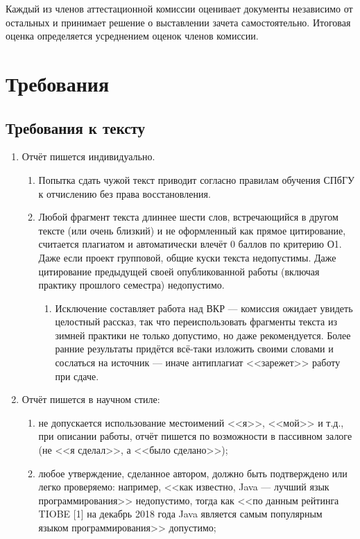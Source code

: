 \documentclass{article}
\begin{document}
Каждый из членов аттестационной комиссии оценивает документы независимо от остальных и принимает решение о выставлении зачета самостоятельно. Итоговая оценка определяется усреднением оценок членов комиссии.

\section{Требования}

\subsection{Требования к тексту}

\begin{enumerate}
    \item Отчёт пишется индивидуально.
    \begin{enumerate}
        \item Попытка сдать чужой текст приводит согласно правилам обучения СПбГУ к отчислению без права восстановления.
        \item Любой фрагмент текста длиннее шести слов, встречающийся в другом тексте (или очень близкий) и не оформленный как прямое цитирование, считается плагиатом и автоматически влечёт 0 баллов по критерию О1. Даже если проект групповой, общие куски текста недопустимы. Даже цитирование предыдущей своей опубликованной работы (включая практику прошлого семестра) недопустимо.
        \begin{enumerate}
            \item Исключение составляет работа над ВКР --- комиссия ожидает увидеть целостный рассказ, так что переиспользовать фрагменты текста из зимней практики не только допустимо, но даже рекомендуется. Более ранние результаты придётся всё-таки изложить своими словами и сослаться на источник --- иначе антиплагиат <<зарежет>> работу при сдаче.
        \end{enumerate}
    \end{enumerate}
    \item Отчёт пишется в научном стиле:
    \begin{enumerate}
        \item не допускается использование местоимений <<я>>, <<мой>> и т.д., при описании работы, отчёт пишется по возможности в пассивном залоге (не <<я сделал>>, а <<было сделано>>);
        \item любое утверждение, сделанное автором, должно быть подтверждено или легко проверяемо: например, <<как известно, Java --- лучший язык программирования>> недопустимо, тогда как <<по данным рейтинга TIOBE [1] на декабрь 2018 года Java является самым популярным языком программирования>> допустимо;

\end{enumerate}
\end{enumerate}
\end{document}

